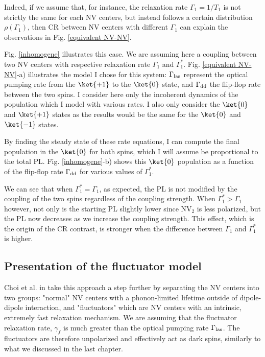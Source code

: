 \documentclass[a4paper,11pt]{report}
\begin{document}
Indeed, if we assume that, for instance, the relaxation rate $\Gamma_1=1/T_1$ is not strictly the same for each NV centers, but instead follows a certain distribution $\rho(\Gamma_1)$, then CR between NV centers with different $\Gamma_1$ can explain the observations in Fig. \ref{equivalent NV-NV}.

Fig. \ref{inhomogene} illustrates this case. We are assuming here a coupling between two NV centers with respective relaxation rate $\Gamma_1$ and $\Gamma_1^*$. Fig. \ref{equivalent NV-NV}-a) illustrates the model I chose for this system: $\Gamma_{\rm las}$ represent the optical pumping rate from the $\ket{+1}$ to the $\ket{0}$ state, and $\Gamma_{\rm dd}$ the flip-flop rate between the two spins. I consider here only the incoherent dynamics of the population which I model with various rates. I also only consider the $\ket{0}$ and $\ket{+1}$ states as the results would be the same for the $\ket{0}$ and $\ket{-1}$ states. 

By finding the steady state of these rate equations, I can compute the final population in the $\ket{0}$ for both spins, which I will assume be proportional to the total PL. Fig. \ref{inhomogene}-b) shows this $\ket{0}$ population as a function of the flip-flop rate $\Gamma_{\rm dd}$ for various values of $\Gamma_1^*$.

We can see that when $\Gamma_1^*=\Gamma_1$, as expected, the PL is not modified by the coupling of the two spins regardless of the coupling strength. When $\Gamma_1^*>\Gamma_1$ however, not only is the starting PL slightly lower since NV$_2$ is less polarized, but the PL now decreases as we increase the coupling strength. This effect, which is the origin of the CR contrast, is stronger when the difference between $\Gamma_1$ and $\Gamma_1^*$ is higher.

\subsection{Presentation of the fluctuator model}
Choi et al. in \citep{choi2017depolarization} take this approach a step further by separating the NV centers into two groups: "normal" NV centers with a phonon-limited lifetime outside of dipole-dipole interaction, and "fluctuators" which are NV centers with an intrinsic, extremely fast relaxation mechanism. We are assuming that the fluctuator relaxation rate, $\gamma_f$ is much greater than the optical pumping rate $\Gamma_{\rm las}$. The fluctuators are therefore unpolarized and effectively act as dark spins, similarly to what we discussed in the last chapter.
\end{document}
